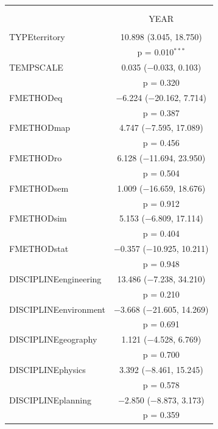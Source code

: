 \begin{table}%
\begin{tabular}{@{\extracolsep{5pt}}lc} 
\footnotesize
\\[-1.8ex]\hline 
\hline \\[-1.8ex] 
\\[-1.8ex] & YEAR \\ 
\hline \\[-1.8ex] 
 TYPEterritory & 10.898 (3.045, 18.750) \\ 
  & p = 0.010$^{***}$ \\ 
  TEMPSCALE & 0.035 ($-$0.033, 0.103) \\ 
  & p = 0.320 \\ 
  FMETHODeq & $-$6.224 ($-$20.162, 7.714) \\ 
  & p = 0.387 \\ 
  FMETHODmap & 4.747 ($-$7.595, 17.089) \\ 
  & p = 0.456 \\ 
  FMETHODro & 6.128 ($-$11.694, 23.950) \\ 
  & p = 0.504 \\ 
  FMETHODsem & 1.009 ($-$16.659, 18.676) \\ 
  & p = 0.912 \\ 
  FMETHODsim & 5.153 ($-$6.809, 17.114) \\ 
  & p = 0.404 \\ 
  FMETHODstat & $-$0.357 ($-$10.925, 10.211) \\ 
  & p = 0.948 \\ 
  DISCIPLINEengineering & 13.486 ($-$7.238, 34.210) \\ 
  & p = 0.210 \\ 
  DISCIPLINEenvironment & $-$3.668 ($-$21.605, 14.269) \\ 
  & p = 0.691 \\ 
  DISCIPLINEgeography & 1.121 ($-$4.528, 6.769) \\ 
  & p = 0.700 \\ 
  DISCIPLINEphysics & 3.392 ($-$8.461, 15.245) \\ 
  & p = 0.578 \\ 
  DISCIPLINEplanning & $-$2.850 ($-$8.873, 3.173) \\ 
  & p = 0.359 \\ 

\end{tabular}
\end{table}
